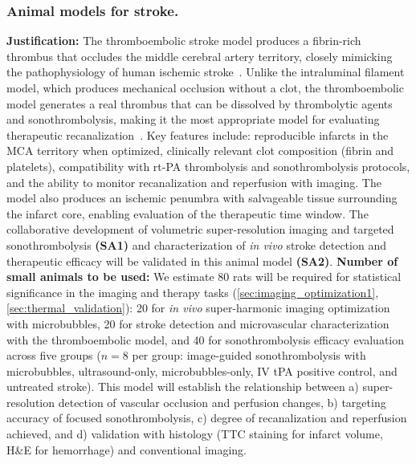 \subsubsection{Animal models for stroke.}
\textbf{Justification:} The thromboembolic stroke model produces a fibrin-rich thrombus that occludes the middle cerebral artery territory, closely mimicking the pathophysiology of human ischemic stroke~\cite{orset2007mouse,niessen2003thromboembolic,carmichael2005rodent}. Unlike the intraluminal filament model, which produces mechanical occlusion without a clot, the thromboembolic model generates a real thrombus that can be dissolved by thrombolytic agents and sonothrombolysis, making it the most appropriate model for evaluating therapeutic recanalization~\cite{andjus2024preclinical}. Key features include: reproducible infarcts in the MCA territory when optimized, clinically relevant clot composition (fibrin and platelets), compatibility with rt-PA thrombolysis and sonothrombolysis protocols, and the ability to monitor recanalization and reperfusion with imaging. The model also produces an ischemic penumbra with salvageable tissue surrounding the infarct core, enabling evaluation of the therapeutic time window. 
The collaborative development of volumetric super-resolution imaging and targeted sonothrombolysis \textbf{(SA1)} and characterization of \textit{in vivo} stroke detection and therapeutic efficacy will be validated in this animal model \textbf{(SA2)}.
\textbf{Number of small animals to be used:} We estimate 80 rats will be required for statistical significance in the imaging and therapy tasks (\ref{sec:imaging_optimization1}, \ref{sec:thermal_validation}): 20 for \textit{in vivo} super-harmonic imaging optimization with microbubbles, 20 for stroke detection and microvascular characterization with the thromboembolic model, and 40 for sonothrombolysis efficacy evaluation across five groups ($n=8$ per group: image-guided sonothrombolysis with microbubbles, ultrasound-only, microbubbles-only, IV tPA positive control, and untreated stroke). This model will establish the relationship between a) super-resolution detection of vascular occlusion and perfusion changes, b) targeting accuracy of focused sonothrombolysis, c) degree of recanalization and reperfusion achieved, and d) validation with histology (TTC staining for infarct volume, H\&E for hemorrhage) and conventional imaging.
